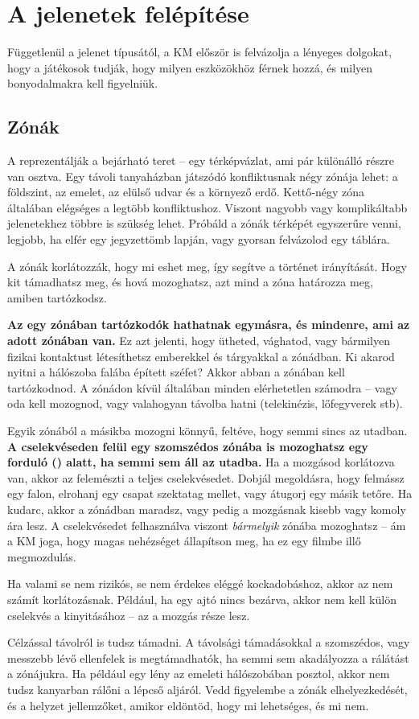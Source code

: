 \section{A jelenetek felépítése}

Függetlenül a jelenet típusától, a KM először is felvázolja a lényeges dolgokat, hogy a játékosok tudják, hogy milyen eszközökhöz férnek hozzá, és milyen bonyodalmakra kell figyelniük.

\subsection{Zónák}

A  reprezentálják a bejárható teret – egy térképvázlat, ami pár különálló részre van osztva. Egy távoli tanyaházban játszódó konfliktusnak négy zónája lehet: a földszint, az emelet, az elülső udvar és a környező erdő. Kettő‑négy zóna általában elégséges a legtöbb konfliktushoz. Viszont nagyobb vagy komplikáltabb jelenetekhez többre is szükség lehet. Próbáld a zónák térképét egyszerűre venni, legjobb, ha elfér egy jegyzettömb lapján, vagy gyorsan felvázolod egy táblára.

A zónák korlátozzák, hogy mi eshet meg, így segítve a történet irányítását. Hogy kit támadhatsz meg, és hová mozoghatsz, azt mind a zóna határozza meg, amiben tartózkodsz.

\textbf{Az egy zónában tartózkodók hathatnak egymásra, és mindenre, ami az adott zónában van.} Ez azt jelenti, hogy ütheted, vághatod, vagy bármilyen fizikai kontaktust létesíthetsz emberekkel és tárgyakkal a zónádban. Ki akarod nyitni a hálószoba falába épített széfet? Akkor abban a zónában kell tartózkodnod. A zónádon kívül általában minden elérhetetlen számodra – vagy oda kell mozognod, vagy valahogyan távolba hatni (telekinézis, lőfegyverek stb).

Egyik zónából a másikba mozogni könnyű, feltéve, hogy semmi sincs az utadban. \textbf{A cselekvéseden felül egy szomszédos zónába is mozoghatsz egy forduló () alatt, ha semmi sem áll az utadba.} Ha a mozgásod korlátozva van, akkor az felemészti a teljes cselekvésedet. Dobjál megoldásra, hogy felmássz egy falon, elrohanj egy csapat szektatag mellet, vagy átugorj egy másik tetőre. Ha kudarc, akkor a zónádban maradsz, vagy pedig a mozgásnak kisebb vagy komoly ára lesz. A cselekvésedet felhasználva viszont \emph{bármelyik} zónába mozoghatsz – ám a KM joga, hogy magas nehézséget állapítson meg, ha ez egy filmbe illő megmozdulás.

Ha valami se nem rizikós, se nem érdekes eléggé kockadobáshoz, akkor az nem számít korlátozásnak. Például, ha egy ajtó nincs bezárva, akkor nem kell külön cselekvés a kinyitásához – az a mozgás része lesz.

Célzással távolról is tudsz támadni. A távolsági támadásokkal a szomszédos, vagy messzebb lévő ellenfelek is megtámadhatók, ha semmi sem akadályozza a rálátást a zónájukra. Ha például egy lény az emeleti hálószobában posztol, akkor nem tudsz kanyarban rálőni a lépcső aljáról. Vedd figyelembe a zónák elhelyezkedését, és a helyzet jellemzőket, amikor eldöntöd, hogy mi lehetséges, és mi nem.

